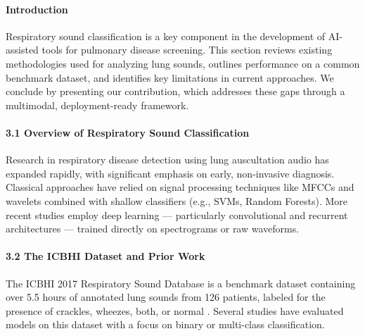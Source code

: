 \paragraph{Introduction\\}
Respiratory sound classification is a key component in the development of AI-assisted tools for pulmonary disease screening. This section reviews existing methodologies used for analyzing lung sounds, outlines performance on a common benchmark dataset, and identifies key limitations in current approaches. We conclude by presenting our contribution, which addresses these gaps through a multimodal, deployment-ready framework.

\newpage

\paragraph{3.1 Overview of Respiratory Sound Classification\\}
Research in respiratory disease detection using lung auscultation audio has expanded rapidly, with significant emphasis on early, non-invasive diagnosis. Classical approaches have relied on signal processing techniques like MFCCs and wavelets combined with shallow classifiers (e.g., SVMs, Random Forests). More recent studies employ deep learning — particularly convolutional and recurrent architectures — trained directly on spectrograms or raw waveforms.

\paragraph{3.2 The ICBHI Dataset and Prior Work\\}
The ICBHI 2017 Respiratory Sound Database is a benchmark dataset containing over 5.5 hours of annotated lung sounds from 126 patients, labeled for the presence of crackles, wheezes, both, or normal \cite{rocha2017open}. Several studies have evaluated models on this dataset with a focus on binary or multi-class classification.


